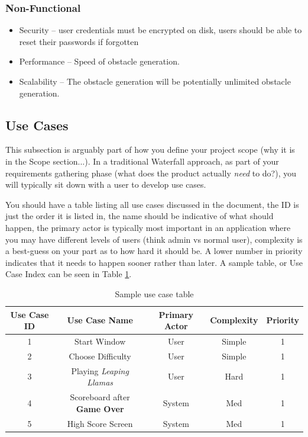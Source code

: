 \documentclass[10pt,conference,onecolumn,compsoc]{IEEEtran}
\begin{document}
\subsubsection{Non-Functional}
	\begin{itemize}
	\item Security -- user credentials must be encrypted on disk, users should be able to reset their passwords if forgotten
	\item Performance -- Speed of obstacle generation.
	\item Scalability -- The obstacle generation will be potentially unlimited obstacle generation.
	\end{itemize}

\subsection{Use Cases}
	This subsection is arguably part of how you define your project scope (why it is in the Scope section...).  In a traditional Waterfall approach, as part of your requirements gathering phase (what does the product actually \emph{need} to do?), you will typically sit down with a user to develop use cases.

	You should have a table listing all use cases discussed in the document, the ID is just the order it is listed in, the name should be indicative of what should happen, the primary actor is typically most important in an application where you may have different levels of users (think admin vs normal user), complexity is a best-guess on your part as to how hard it should be.  A lower number in priority indicates that it needs to happen sooner rather than later.  A sample table, or Use Case Index can be seen in Table \ref{tab:useCaseIndex}.

\begin{table}
\centering
\begin{tabular}{|c|c|c|c|c|}
\hline
Use Case ID & Use Case Name & Primary Actor & Complexity & Priority \\
\hline \hline
1 & Start Window & User & Simple & 1\\
\hline
2 & Choose Difficulty & User & Simple & 1\\
\hline
3 & Playing \textit{Leaping Llamas} & User & Hard & 1\\
\hline
4 & Scoreboard after \textbf{Game Over} & System & Med & 1\\
\hline
5 & High Score Screen & System & Med & 1\\
\hline

\end{tabular}
\caption{Sample use case table}
\label{tab:useCaseIndex}
\end{table}
\end{document}
